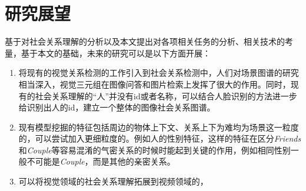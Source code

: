 \section{研究展望}

基于对社会关系理解的分析以及本文提出对各项相关任务的分析、相关技术的考量，基于本文的基础，未来的研究可以是以下方面开展：
\begin{enumerate}
    \item 将现有的视觉关系检测的工作引入到社会关系检测中，人们对场景图谱的研究相当深入，视觉三元组在图像问答和图片检索上发挥了很大的作用。同时，现有的社会关系理解的``人''并没有id或者名称，可以结合人脸识别的方法进一步给识别出人的id，建立一个整体的图像社会关系图谱。
    \item 现有模型挖掘的特征包括周边的物体上下文、关系上下为难均为场景这一粒度的，可以尝试加入更细粒度的。例如人的性别特征，这样的特征在区分{\it Friends}和{\it Couple}等容易混淆的气密关系的时候时能起到关键的作用，例如相同性别一般不可能是{\it Couple}，而是其他的亲密关系。
    \item 可以将视觉领域的社会关系理解拓展到视频领域的，
\end{enumerate}

